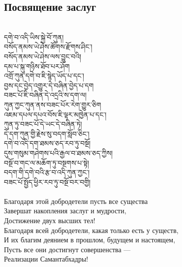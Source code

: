 \subsection{Посвящение заслуг}
\\
\ti
དགེ་བ་འདི་ཡིས་སྐྱེ་བོ་ཀུན།\\
བསོད་ནམས་ཡེ་ཤེས་ཚོགས་རྫོགས་ཤིང༌།\\
བསོད་ནམས་ཡེ་ཤེས་ལས་བྱུང་བའི།\\
དམ་པ་སྐུ་གཉིས་ཐོབ་པར་ཤོག \\
འགྲོ་ཀུན་དགེ་བ་ཇི་སྙེད་ཡོད་པ་དང༌།\\
བྱས་དང་བྱེད་འགྱུར་དེ་བཞིན་བྱེད་པ་དག \\
བཟང་པོ་ཇི་བཞིན་དེ་འདྲའི་ས་དག་ལ།\\
ཀུན་ཀྱང་ཀུན་ནས་བཟང་པོར་རེག་གྱུར་ཅིག\\
འཇམ་དཔལ་དཔའ་བོས་ཇི་ལྟར་མཁྱེན་པ་དང༌། \\
ཀུན་ཏུ་བཟང་པོ་དེ་ཡང་དེ་བཞིན་ཏེ།\\
དེ་དག་ཀུན་གྱི་རྗེས་སུ་བདག་སློབ་ཅིང༌། \\
དགེ་བ་འདི་དག་ཐམས་ཅད་རབ་ཏུ་བསྔོ།\\
དུས་གསུམ་གཤེགས་པའི་རྒྱལ་བ་ཐམས་ཅད་ཀྱིས།\\
བསྔོ་བ་གང་ལ་མཆོག་ཏུ་བསྔགས་པ་སྟེ།\\
བདག་གི་དགེ་བའི་རྩ་བ་འདི་ཀུན་ཀྱང༌།\\
བཟང་པོ་སྤྱོད་ཕྱིར་རབ་ཏུ་བསྔོ་བར་བགྱི། \\
\\
\ru
Благодаря этой добродетели пусть все существа\\
Завершат накопления заслуг и мудрости,\\
Достижение двух высших тел!\\
Благодаря всей добродетели, какая только есть у существ,\\
И их благим деянием в прошлом, будущем и настоящем,\\
Пусть все они достигнут совершенства —\\
Реализации Самантабхадры!\\
\\
